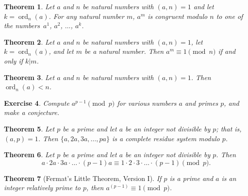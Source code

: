\documentclass[11pt,leqno]{article}
\newtheorem{thm}{Theorem}[section]
\newtheorem{exer}[thm]{Exercise}
\theoremstyle{definition}
\newcommand{\ord}{\operatorname{ord}}
\begin{document}
\begin{thm}
Let $a$ and $n$ be natural numbers with $(a, n) = 1$ and let $k =
\ord_n(a)$.  For any natural number $m$, $a^m$ is congruent modulo
$n$ to one of the numbers~$a^1$, $a^2$, $\hdots$, $a^k$.
\end{thm}


\begin{thm}
Let $a$ and $n$ be natural numbers with $(a, n) = 1$, let $k =
\ord_n(a)$, and let $m$ be a natural number.  Then $a^m \equiv 1
\pmod{n}$ if and only if $k|m$.
\end{thm}

\begin{thm}
Let $a$ and $n$ be natural numbers with $(a, n) = 1$. Then
$\ord_n(a) < n$.
\end{thm}

\begin{exer}
Compute $a^{p-1} \pmod{p}$ for various numbers $a$ and primes $p$,
and make a conjecture.
\end{exer}


\begin{thm}
Let $p$ be a prime and let $a$ be an integer not divisible by $p$;
that is, $(a, p) = 1$.  Then $\{a, 2a, 3a, \hdots, pa\}$ is a
complete residue system modulo $p$.
\end{thm}


\begin{thm}
Let $p$ be a prime and let $a$ be an integer not divisible by $p$.
Then
\[a \cdot 2a \cdot 3a \cdot \hdots \cdot (p-1)a \equiv
    1 \cdot 2 \cdot 3 \cdot \hdots \cdot (p-1) \pmod{p}.\]
\end{thm}


\begin{thm}[Fermat's Little Theorem, Version I]
If $p$ is a prime and $a$ is an integer relatively prime to $p$,
then $a^{(p-1)} \equiv 1 \pmod{p}$.
\end{thm}
\end{document}

